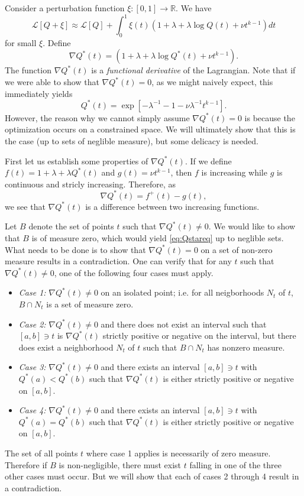 \documentclass[12pt]{article}
\begin{document}
Consider a perturbation function $\xi: [0,1] \to \mathbb{R}$.
We have
\[
\mathcal{L}[Q + \xi] \approx \mathcal{L}[Q] + \int_0^1 \xi(t) (1 + \lambda + \lambda \log Q(t) + \nu t^{k-1}) dt
\]
for small $\xi$.
Define
\[
\nabla Q^*(t) = (1 + \lambda + \lambda \log Q^*(t) + \nu t^{k-1}).
\]
The function $\nabla Q^*(t)$ is a \emph{functional derivative} of the Lagrangian.
Note that if we were able to show that $\nabla Q^*(t) = 0$, as we might naively expect,
this immediately yields
\begin{equation}\label{eq:Qstareq}
Q^*(t) = \exp[-\lambda^{-1} - 1 - \nu\lambda^{-1} t^{k-1}].
\end{equation}
However, the reason why we cannot simply assume $\nabla Q^*(t) = 0$ is
because the optimization occurs on a constrained space.  We will
ultimately show that this is the case (up to sets of neglible
measure), but some delicacy is needed.


First let us establish some properties of $\nabla Q^*(t)$.  
If we define $f(t) = 1+ \lambda + \lambda Q^*(t)$
and $g(t) = \nu t^{k-1}$, then $f$ is increasing while $g$ is continuous and stricly increasing.
Therefore, as
\[
\nabla Q^*(t) = f^+(t) - g(t),
\]
we see that $\nabla Q^*(t)$ is a difference between two increasing
functions.






Let $B$ denote the set of points $t$ such that $\nabla Q^*(t) \neq 0$.
We would like to show that $B$ is of measure zero, which would
yield \eqref{eq:Qstareq} up to neglible sets.  What needs to be done
is to show that $\nabla Q^*(t) = 0$ on a set of non-zero measure
results in a contradiction.  One can verify that for any $t$ such that
$\nabla Q^*(t) \neq 0$, one of the following four cases must apply.
\begin{itemize}
\item \emph{Case 1:} $\nabla Q^*(t) \neq 0$ on an isolated point; i.e. for all neigborhoods $N_t$ of $t$, $B \cap N_t$ is a set of measure zero.
\item \emph{Case 2:} $\nabla Q^*(t) \neq 0$ and there does not exist an interval such that
$[a, b] \ni t$ is $\nabla Q^*(t)$ strictly positive or negative on the
interval, but there does exist a neighborhood $N_t$ of $t$ such that $B \cap N_t$ has nonzero measure.
\item \emph{Case 3:}  $\nabla Q^*(t) \neq 0$ and there exists an interval
 $[a, b] \ni t$ with $Q^*(a) < Q^*(b)$ such that $\nabla Q^*(t)$ is
 either strictly positive or negative on $[a,b]$.
\item \emph{Case 4:} $\nabla Q^*(t) \neq 0$ and there exists an interval
 $[a, b] \ni t$ with $Q^*(a) = Q^*(b)$ such that $\nabla Q^*(t)$ is
 either strictly positive or negative on $[a,b]$.
\end{itemize}
The set of all points $t$ where case 1 applies is necessarily of zero
measure.  Therefore if $B$ is non-negligible, there must exist $t$
falling in one of the three other cases must occur.  But we will show that 
each of cases 2 through 4 result in a contradiction.
\end{document}
